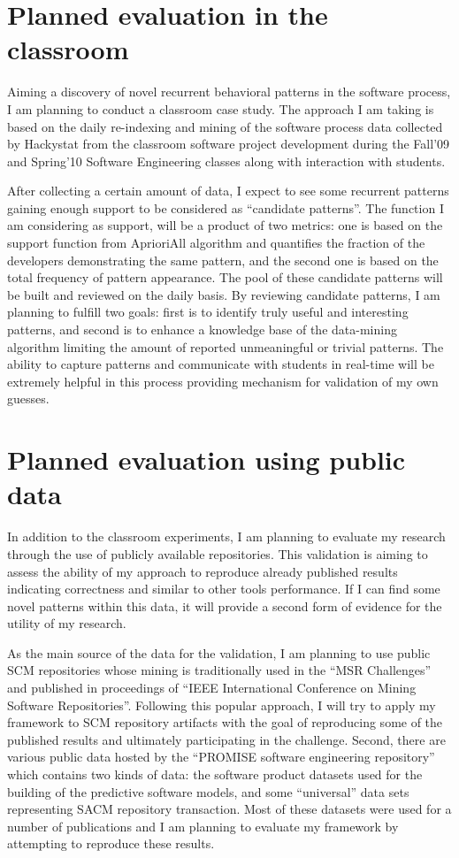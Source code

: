 \section{Planned evaluation in the classroom}
Aiming a discovery of novel recurrent behavioral patterns in the software process, I am planning to conduct a classroom case study. The approach I am taking is based on the daily re-indexing and mining of the software process data collected by Hackystat from the classroom software project development during the Fall'09 and Spring'10 Software Engineering classes along with interaction with students. 

After collecting a certain amount of data, I expect to see some recurrent patterns gaining enough support to be considered as ``candidate patterns''. The function I am considering as support, will be a product of two metrics: one is based on the support function from AprioriAll algorithm and quantifies the fraction of the developers demonstrating the same pattern, and the second one is based on the total frequency of pattern appearance. The pool of these candidate patterns will be built and reviewed on the daily basis. By reviewing candidate patterns, I am planning to fulfill two goals: first is to identify truly useful and interesting patterns, and second is to enhance a knowledge base of the data-mining algorithm limiting the amount of reported unmeaningful or trivial patterns. The ability to capture patterns and communicate with students in real-time will be extremely helpful in this process providing mechanism for validation of my own guesses.


\section{Planned evaluation using public data}
In addition to the classroom experiments, I am planning to evaluate my research through the use of publicly available repositories. This validation is aiming to assess the ability of my approach to reproduce already published results indicating correctness and similar to other tools performance. If I can find some novel patterns within this data, it will provide a second form of evidence for the utility of my research.

As the main source of the data for the validation, I am planning to use public SCM repositories whose mining is traditionally used in the ``MSR Challenges'' \cite{citeulike:5043676} and published in proceedings of ``IEEE International Conference on Mining Software Repositories''. Following this popular approach, I will try to apply my framework to SCM repository artifacts with the goal of reproducing some of the published results and ultimately participating in the challenge. Second, there are various public data hosted by the ``PROMISE software engineering repository'' \cite{Sayyad:2005} which contains two kinds of data: the software product datasets used for the building of the predictive software models, and some ``universal'' data sets representing SACM repository transaction. Most of these datasets were used for a number of publications and I am planning to evaluate my framework by attempting to reproduce these results. 